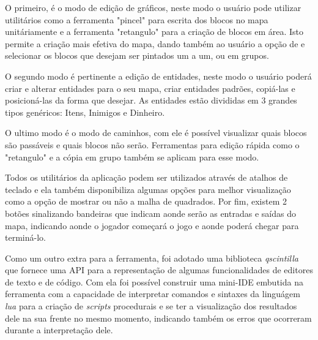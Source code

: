 O primeiro, é o modo de edição de gráficos, neste modo o usuário pode utilizar utilitários como a ferramenta "pincel" para escrita dos blocos no mapa unitáriamente e a ferramenta "retangulo" para a criação de blocos em área. Isto permite a criação mais efetiva do mapa, dando também ao usuário a opção de e selecionar os blocos que desejam ser pintados um a um, ou em grupos. 

O segundo modo é pertinente a edição de entidades, neste modo o usuário poderá criar e alterar entidades para o seu mapa, criar entidades padrões, copiá-las e posicioná-las da forma que desejar. As entidades estão divididas em 3 grandes tipos genéricos: Itens, Inimigos e Dinheiro.


O ultimo modo é o modo de caminhos, com ele é possível visualizar quais blocos são passáveis e quais blocos não serão. Ferramentas para edição rápida como o "retangulo" e a cópia em grupo também se aplicam para esse modo.

Todos os utilitários da aplicação podem ser utilizados através de atalhos de teclado e ela também disponibiliza algumas opções para melhor visualização como a opção de mostrar ou não a malha de quadrados. Por fim, existem 2 botões sinalizando bandeiras que indicam aonde serão as entradas e saídas do mapa, indicando aonde o jogador começará o jogo e aonde poderá chegar para terminá-lo.

Como um outro extra para a ferramenta, foi adotado uma biblioteca \textit{qscintilla} que fornece uma API para a representação de algumas funcionalidades de editores de texto e de código. Com ela foi possível construir uma mini-IDE embutida na ferramenta com a capacidade de interpretar comandos e sintaxes da linguágem \textit{lua} para a criação de \textit{scripts} procedurais e se ter a visualização dos resultados dele na sua frente no mesmo momento, indicando também os erros que ocorreram durante a interpretação dele. 



